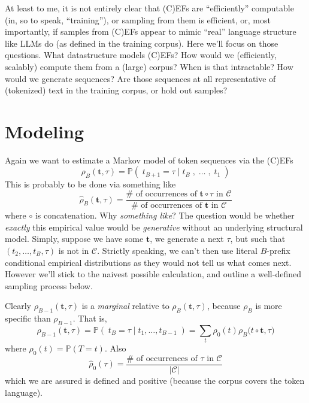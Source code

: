 \documentclass[11pt, oneside]{amsart}   	%
\begin{document}
At least to me, it is not entirely clear that (C)EFs are ``efficiently'' computable (in, so to speak, ``training''), or sampling from them is efficient, or, most importantly, if samples from (C)EFs appear to mimic ``real'' language structure like LLMs do (as defined in the training corpus). Here we'll focus on those questions. What datastructure models (C)EFs? How would we (efficiently, scalably) compute them from a (large) corpus? When is that intractable? How would we generate sequences? Are those sequences at all representative of (tokenized) text in the training corpus, or hold out samples?

\section{Modeling}

Again we want to estimate a Markov model of token sequences via the (C)EFs
\begin{equation*}
	\rho_B(\mathbf{t}, \tau) = \mathbb{P}(\; t_{B+1} = \tau \; | \; t_B \; , \; \dotsc \; , \; t_1 \; )
\end{equation*}
This is probably to be done via something like
\begin{equation*}
	\hat{\rho}_B(\mathbf{t},\tau) 
		= \frac{ \#\text{ of occurrences of }\mathbf{t} \circ \tau\text{ in }\mathcal{C} }
			{ \#\text{ of occurrences of }\mathbf{t}\text{ in }\mathcal{C} }
\end{equation*}
where $\circ$ is concatenation. Why {\em something like}? The question would be whether {\em exactly} this empirical value would be {\em generative} without an underlying structural model. Simply, suppose we have some $\mathbf{t}$, we generate a next $\tau$, but such that $(t_2,\dotsc,t_B,\tau)$ is not in $\mathcal{C}$. Strictly speaking, we can't then use literal $B$-prefix conditional empirical distributions as they would not tell us what comes next. However we'll stick to the naivest possible calculation, and outline a well-defined sampling process below. 

Clearly $\rho_{B-1}(\mathbf{t}, \tau)$ is a {\em marginal} relative to $\rho_B(\mathbf{t}, \tau)$, because $\rho_B$ is more specific than $\rho_{B-1}$. That is, 
\begin{equation*}
	\rho_{B-1}(\mathbf{t}, \tau) 
		= \mathbb{P}(\; t_{B} = \tau \; | \; t_1, \dotsc , t_{B-1} \; )
		= \sum_t \rho_{0}(t) \rho_B\big( t \circ \mathbf{t}, \tau\big)
\end{equation*}
where $\rho_{0}(t) = \mathbb{P}(T = t)$. Also
\begin{equation*}
	\hat{\rho}_{0}(\tau) = \frac{\#\text{ of occurrences of }\tau\text{ in }\mathcal{C}}{|\mathcal{C}|}
\end{equation*}
which we are assured is defined and positive (because the corpus covers the token language). 
\end{document}
